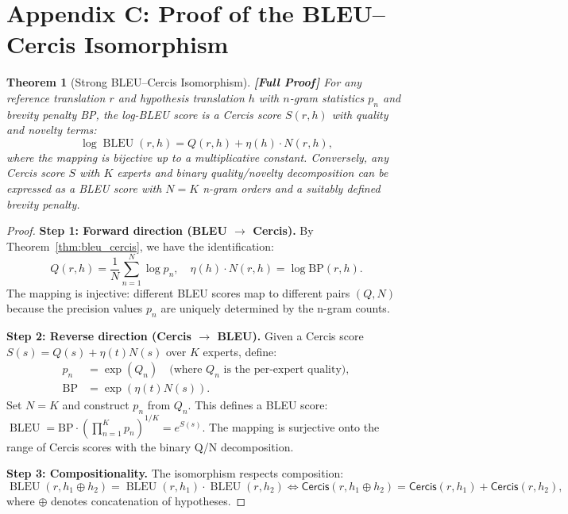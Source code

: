 \documentclass[12pt,a4paper]{article}
\newtheorem{theorem}{Theorem}[section]
\theoremstyle{remark}
\newcommand{\Cercis}{\textsf{Cercis}}
\DeclareMathOperator{\BLEU}{BLEU}
\newcommand{\rigorFull}{\textbf{[Full Proof]}}
\begin{document}
\section*{Appendix C: Proof of the BLEU--Cercis Isomorphism}
\label{app:bleu_cercis}

\begin{theorem}[Strong BLEU--Cercis Isomorphism]
\label{thm:strong_bleu_cercis}
\rigorFull
For any reference translation $r$ and hypothesis translation $h$
with $n$-gram statistics $p_n$ and brevity penalty BP, the log-BLEU
score is a \Cercis{} score $S(r, h)$ with quality and novelty terms:
\begin{equation}
  \log\BLEU(r, h) = Q(r, h) + \eta(h) \cdot N(r, h),
\end{equation}
where the mapping is bijective up to a multiplicative constant.
Conversely, any \Cercis{} score $S$ with $K$ experts and binary
quality/novelty decomposition can be expressed as a BLEU score
with $N = K$ n-gram orders and a suitably defined brevity penalty.
\end{theorem}

\begin{proof}
\noindent\textbf{Step 1: Forward direction (BLEU $\to$ Cercis).}
By Theorem~\ref{thm:bleu_cercis}, we have the identification:
\begin{equation}
  Q(r, h) = \frac{1}{N}\sum_{n=1}^N \log p_n, \quad
  \eta(h) \cdot N(r, h) = \log\text{BP}(r, h).
\end{equation}
The mapping is injective: different BLEU scores map to different
pairs $(Q, N)$ because the precision values $p_n$ are uniquely
determined by the n-gram counts.

\smallskip
\noindent\textbf{Step 2: Reverse direction (Cercis $\to$ BLEU).}
Given a \Cercis{} score $S(s) = Q(s) + \eta(t)N(s)$ over $K$
experts, define:
\begin{align}
  p_n &= \exp(Q_n) \quad \text{(where } Q_n \text{ is the per-expert quality)},\\
  \text{BP} &= \exp(\eta(t)N(s)).
\end{align}
Set $N = K$ and construct $p_n$ from $Q_n$. This defines a BLEU
score: $\BLEU = \text{BP} \cdot (\prod_{n=1}^K p_n)^{1/K} = e^{S(s)}$.
The mapping is surjective onto the range of \Cercis{} scores with
the binary Q/N decomposition.

\smallskip
\noindent\textbf{Step 3: Compositionality.}
The isomorphism respects composition:
\begin{equation}
  \BLEU(r, h_1 \oplus h_2) = \BLEU(r, h_1) \cdot \BLEU(r, h_2)
  \iff \Cercis(r, h_1 \oplus h_2) = \Cercis(r, h_1) + \Cercis(r, h_2),
\end{equation}
where $\oplus$ denotes concatenation of hypotheses.
\end{proof}
\end{document}
